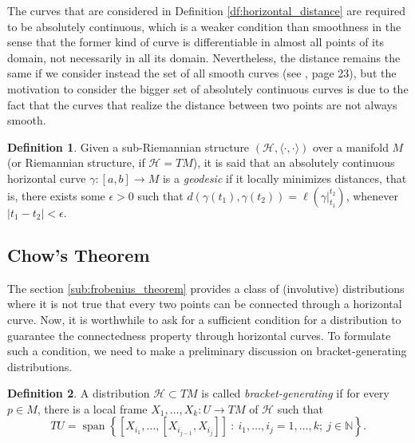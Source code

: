 \documentclass[12pt, letterpaper, reqno]{amsart}
\theoremstyle{definition}
\newtheorem{df}{Definition}
\theoremstyle{plain}
\theoremstyle{remark}
\begin{document}
The curves that are considered in Definition \ref{df:horizontal_distance} are required to be absolutely continuous, which is a weaker condition than smoothness in the sense that the former kind of curve is differentiable in almost all points of its domain, not necessarily in all its domain. Nevertheless, the distance remains the same if we consider instead the set of all smooth curves (see \cite{montgomery2002tour}, page 23), but the motivation to consider the bigger set of absolutely continuous curves is due to the fact that the curves that realize the distance between two points are not always smooth.

\begin{df}
	Given a sub-Riemannian structure $ (\mathcal{H}, \langle\cdot,\cdot\rangle) $ over a manifold $ M $  (or Riemannian structure, if $ \mathcal{H}=TM $), it is said that an absolutely continuous horizontal curve $ \gamma:  [a,b] \rightarrow M$ is a \textit{geodesic} if it locally minimizes distances, that is, there exists some $ \epsilon>0 $ such that $ d(\gamma(t_1),\gamma(t_2))=\ell(\gamma|_{t_1}^{t_2}) $, whenever $ |t_1-t_2|<\epsilon. $  
\end{df}


\subsection{Chow's Theorem}%
\label{sub:chow_s_theorem}

The section \ref{sub:frobenius_theorem} provides a class of (involutive) distributions where it is not true that every two points can be connected through a horizontal curve.  Now, it is worthwhile to ask for a sufficient condition for a distribution to guarantee the connectedness property through horizontal curves. To formulate such a condition, we need to make a preliminary discussion on bracket-generating distributions.

\begin{df}
	A distribution $ \mathcal{H}\subset TM $ is called \textit{bracket-generating} if for every $ p\in M $, there is a local frame $ X_1,\dots,X_k: U \rightarrow {TM} $ of $ \mathcal{H} $ such that 
	$$ TU = \operatorname{span}\left\{ [X_{i_1},\dots,[X_{i_{j-1}},X_{i_j}]]\ : \ i_1,\dots,i_j=1,\dots,k;\ j\in \mathbb{N} \right\}.  $$ 
\end{df}
\end{document}
